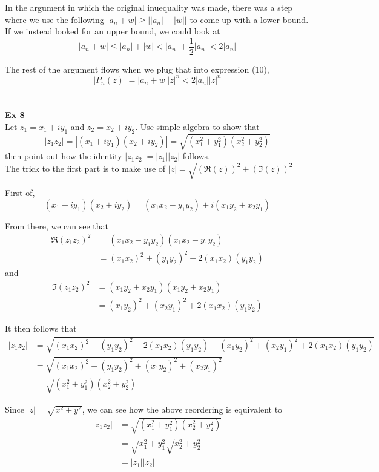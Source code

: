 In the argument in which the original inuequality was made, there was a step where we use the following
$|a_n + w| \geq \left||a_n| - |w|\right|$ to come up with a lower bound.
If we instead looked for an upper bound, we could look at
$$
|a_n + w| \leq |a_n| + |w| < |a_n| + \frac{1}{2}|a_n| < 2|a_n| 
$$

The rest of the argument flows when we plug that into expression (10),
$$
\left| P_n(z) \right| = |a_n + w| |z|^n < 2|a_n||z|^n
$$
\\~\\


\textbf{Ex 8}
\\
Let $z_1 = x_1 + iy_1$ and $z_2 = x_2 + iy_2$.
Use simple algebra to show that
$$
|z_1 z_2| = |(x_1 + iy_1) (x_2 + iy_2)| = \sqrt{ (x_{1}^{2} + y_{1}^{2}) (x_{2}^{2} + y_{2}^{2}) }
$$
then point out how the identity $|z_1 z_2| = |z_1| |z_2|$ follows.
\\

The trick to the first part is to make use of
$|z| = \sqrt{ (\Re(z))^2 + (\Im(z))^2 }$ 

First of,
$$
(x_1 + iy_1) (x_2 + iy_2) = (x_1 x_2 - y_1 y_2) + i (x_1 y_2 + x_2 y_1)
$$

From there, we can see that
\begin{align*}
\Re(z_1 z_2)^2 &= (x_1 x_2 - y_1 y_2) (x_1 x_2 - y_1 y_2) \\
&= (x_1 x_2)^2 + (y_1 y_2)^2 - 2(x_1 x_2)(y_1 y_2)
\end{align*}
and
\begin{align*}
\Im(z_1 z_2)^2 &= (x_1 y_2 + x_2 y_1) (x_1 y_2 + x_2 y_1) \\
&= (x_1 y_2)^2 + (x_2 y_1)^2 + 2(x_1 x_2)(y_1 y_2)
\end{align*}

It then follows that
\begin{align*}
|z_1 z_2| &= \sqrt{ (x_1 x_2)^2 + (y_1 y_2)^2 - 2(x_1 x_2)(y_1 y_2)   +   (x_1 y_2)^2 + (x_2 y_1)^2 + 2(x_1 x_2)(y_1 y_2) } \\
&= \sqrt{ (x_1 x_2)^2 + (y_1 y_2)^2   +  (x_1 y_2)^2 + (x_2 y_1)^2  } \\
&= \sqrt{ (x_{1}^{2} + y_{1}^{2}) (x_{2}^{2} + y_{2}^{2}) }
\end{align*}

Since $|z| = \sqrt{x^2 + y^2}$, we can see how the above reordering is equivalent to
\begin{align*}
|z_1 z_2| &= \sqrt{ (x_{1}^{2} + y_{1}^{2}) (x_{2}^{2} + y_{2}^{2}) } \\
&= \sqrt{ x_{1}^{2} + y_{1}^{2} } \sqrt{ x_{2}^{2} + y_{2}^{2} } \\
&= |z_1| |z_2|
\end{align*}
\\~\\


